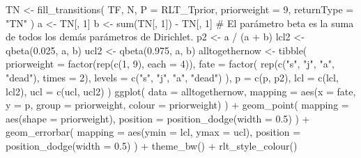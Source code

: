 \documentclass[
  12pt,
  letterpaper,
]{book}
\newenvironment{Shaded}{\begin{snugshade}}{\end{snugshade}}
\newcommand{\AttributeTok}[1]{\textcolor[rgb]{0.40,0.45,0.13}{#1}}
\newcommand{\CommentTok}[1]{\textcolor[rgb]{0.37,0.37,0.37}{#1}}
\newcommand{\DecValTok}[1]{\textcolor[rgb]{0.68,0.00,0.00}{#1}}
\newcommand{\FloatTok}[1]{\textcolor[rgb]{0.68,0.00,0.00}{#1}}
\newcommand{\FunctionTok}[1]{\textcolor[rgb]{0.28,0.35,0.67}{#1}}
\newcommand{\NormalTok}[1]{\textcolor[rgb]{0.00,0.23,0.31}{#1}}
\newcommand{\OtherTok}[1]{\textcolor[rgb]{0.00,0.23,0.31}{#1}}
\newcommand{\SpecialCharTok}[1]{\textcolor[rgb]{0.37,0.37,0.37}{#1}}
\newcommand{\StringTok}[1]{\textcolor[rgb]{0.13,0.47,0.30}{#1}}
\begin{document}
\begin{Shaded}
\begin{Highlighting}[]
\NormalTok{TN }\OtherTok{\textless{}{-}} \FunctionTok{fill\_transitions}\NormalTok{(}
\NormalTok{  TF,}
\NormalTok{  N,}
  \AttributeTok{P =}\NormalTok{ RLT\_Tprior,}
  \AttributeTok{priorweight =} \DecValTok{9}\NormalTok{,}
  \AttributeTok{returnType =} \StringTok{"TN"}
\NormalTok{)}
\NormalTok{a }\OtherTok{\textless{}{-}}\NormalTok{ TN[, }\DecValTok{1}\NormalTok{]}
\NormalTok{b }\OtherTok{\textless{}{-}} \FunctionTok{sum}\NormalTok{(TN[, }\DecValTok{1}\NormalTok{]) }\SpecialCharTok{{-}}\NormalTok{ TN[, }\DecValTok{1}\NormalTok{] }\CommentTok{\# El parámetro beta es la suma de todos los demás parámetros de Dirichlet.}
\NormalTok{p2 }\OtherTok{\textless{}{-}}\NormalTok{ a }\SpecialCharTok{/}\NormalTok{ (a }\SpecialCharTok{+}\NormalTok{ b)}
\NormalTok{lcl2 }\OtherTok{\textless{}{-}} \FunctionTok{qbeta}\NormalTok{(}\FloatTok{0.025}\NormalTok{, a, b)}
\NormalTok{ucl2 }\OtherTok{\textless{}{-}} \FunctionTok{qbeta}\NormalTok{(}\FloatTok{0.975}\NormalTok{, a, b)}
\NormalTok{alltogethernow }\OtherTok{\textless{}{-}} \FunctionTok{tibble}\NormalTok{(}
  \AttributeTok{priorweight =} \FunctionTok{factor}\NormalTok{(}\FunctionTok{rep}\NormalTok{(}\FunctionTok{c}\NormalTok{(}\DecValTok{1}\NormalTok{, }\DecValTok{9}\NormalTok{), }\AttributeTok{each =} \DecValTok{4}\NormalTok{)),}
  \AttributeTok{fate =} \FunctionTok{factor}\NormalTok{(}
    \FunctionTok{rep}\NormalTok{(}\FunctionTok{c}\NormalTok{(}\StringTok{"s"}\NormalTok{, }\StringTok{"j"}\NormalTok{, }\StringTok{"a"}\NormalTok{, }\StringTok{"dead"}\NormalTok{), }\AttributeTok{times =} \DecValTok{2}\NormalTok{),}
    \AttributeTok{levels =} \FunctionTok{c}\NormalTok{(}\StringTok{"s"}\NormalTok{, }\StringTok{"j"}\NormalTok{, }\StringTok{"a"}\NormalTok{, }\StringTok{"dead"}\NormalTok{)}
\NormalTok{  ),}
  \AttributeTok{p =} \FunctionTok{c}\NormalTok{(p, p2),}
  \AttributeTok{lcl =} \FunctionTok{c}\NormalTok{(lcl, lcl2),}
  \AttributeTok{ucl =} \FunctionTok{c}\NormalTok{(ucl, ucl2)}
\NormalTok{)}
\FunctionTok{ggplot}\NormalTok{(}
  \AttributeTok{data =}\NormalTok{ alltogethernow,}
  \AttributeTok{mapping =} \FunctionTok{aes}\NormalTok{(}\AttributeTok{x =}\NormalTok{ fate, }\AttributeTok{y =}\NormalTok{ p, }\AttributeTok{group =}\NormalTok{ priorweight, }\AttributeTok{colour =}\NormalTok{ priorweight)}
\NormalTok{) }\SpecialCharTok{+}
  \FunctionTok{geom\_point}\NormalTok{(}
    \AttributeTok{mapping =} \FunctionTok{aes}\NormalTok{(}\AttributeTok{shape =}\NormalTok{ priorweight),}
    \AttributeTok{position =} \FunctionTok{position\_dodge}\NormalTok{(}\AttributeTok{width =} \FloatTok{0.5}\NormalTok{)}
\NormalTok{  ) }\SpecialCharTok{+}
  \FunctionTok{geom\_errorbar}\NormalTok{(}
    \AttributeTok{mapping =} \FunctionTok{aes}\NormalTok{(}\AttributeTok{ymin =}\NormalTok{ lcl, }\AttributeTok{ymax =}\NormalTok{ ucl),}
    \AttributeTok{position =} \FunctionTok{position\_dodge}\NormalTok{(}\AttributeTok{width =} \FloatTok{0.5}\NormalTok{)}
\NormalTok{  ) }\SpecialCharTok{+}
  \FunctionTok{theme\_bw}\NormalTok{() }\SpecialCharTok{+}
  \FunctionTok{rlt\_style\_colour}\NormalTok{()}
\end{Highlighting}
\end{Shaded}
\end{document}
